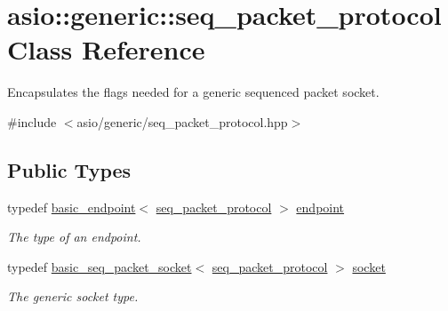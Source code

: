 \hypertarget{classasio_1_1generic_1_1seq__packet__protocol}{}\section{asio\+:\+:generic\+:\+:seq\+\_\+packet\+\_\+protocol Class Reference}
\label{classasio_1_1generic_1_1seq__packet__protocol}


Encapsulates the flags needed for a generic sequenced packet socket.  




{\ttfamily \#include $<$asio/generic/seq\+\_\+packet\+\_\+protocol.\+hpp$>$}

\subsection*{Public Types}
\begin{DoxyCompactItemize}
\item 
typedef \hyperlink{classasio_1_1generic_1_1basic__endpoint}{basic\+\_\+endpoint}$<$ \hyperlink{classasio_1_1generic_1_1seq__packet__protocol}{seq\+\_\+packet\+\_\+protocol} $>$ \hyperlink{classasio_1_1generic_1_1seq__packet__protocol_a61c218617d6ebabb06b8136aab0f9cb7}{endpoint}
\begin{DoxyCompactList}\small\item\em The type of an endpoint. \end{DoxyCompactList}\item 
typedef \hyperlink{classasio_1_1basic__seq__packet__socket}{basic\+\_\+seq\+\_\+packet\+\_\+socket}$<$ \hyperlink{classasio_1_1generic_1_1seq__packet__protocol}{seq\+\_\+packet\+\_\+protocol} $>$ \hyperlink{classasio_1_1generic_1_1seq__packet__protocol_aa9ffbed9ebed0547505737663a1a0a8f}{socket}
\begin{DoxyCompactList}\small\item\em The generic socket type. \end{DoxyCompactList}\end{DoxyCompactItemize}
